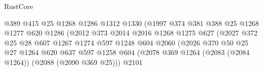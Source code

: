 \begin{lexlean}{RustCore}
\begin{coremodule}
                                        @389
                                        @415
                                        @25
                                        @1268
                                        @1286
                                        @1312
                                        @1330
                                        (@1997
                                          @374
                                          @381
                                          @388
                                          @25
                                          @1268
                                          @1277
                                          @620
                                          @1286
                                          (@2012
                                            @373
                                            @2014
                                            @2016
                                            @1268
                                            @1275
                                            @627
                                            (@2027
                                              @372
                                              @25
                                              @28
                                              @607
                                              @1267
                                              @1274
                                              @597
                                              @1248
                                              @604
                                              @2060
                                              (@2026
                                                @370
                                                @50
                                                @25
                                                @27
                                                @1264
                                                @620
                                                @637
                                                @597
                                                @1258
                                                @604
                                                (@2078
                                                  @369
                                                  @1264
                                                  (@2083 (@2084 @1264))
                                                  (@2088 (@2090 @369 @25)))
                                                @2101

\end{coremodule}
\end{lexlean}
